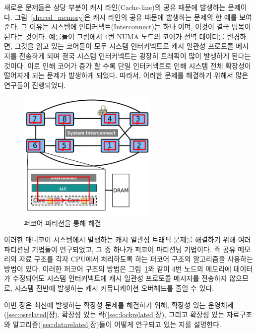 새로운 문제들은 상당 부분이 캐시 라인(Cache-line)의 공유 때문에 발생하는 문제이다.
그림~\ref{shared_memory}은 캐시 라인의 공유 때문에 발생하는 문제의 한 예를 보여준다. 
그 이유는 시스템에 인터커넥트(Interconnect)는 하나 이며, 이것이 결국 병목이 된다는 것이다. 
예를들어 그림에서 4번 NUMA 노드의 코어가 전역 데이터를 변경하면, 그것을 읽고 있는 코어들이 
모두 시스템 인터커넥트로 캐시 일관성 프로토콜 메시지를 전송하게 되며 결국 시스템 인터커넥트는 
굉장히 트래픽이 많이 발생하게 된다는 것이다.  
이로 인해 코어가 증가 할 수록 단일 인터커넥트로 인해 시스템 전체 
확장성이 떨어지게 되는 문제가 발생하게 되었다.
따라서, 이러한 문제를 해결하기 위해서 많은 연구들이 진행되었다. 

\begin{figure}[h!]
    \centering
    \includegraphics[width=0.6\textwidth]{fig/archcache_percore}
    \caption{퍼코어 파티션을 통해 해결}
  \label{shared_memory2}
\end{figure}

이러한 매니코어 시스템에서 발생하는 
캐시 일관성 트래픽 문제를 해결하기 위해 여러 파티션닝 기법들이 연구되었고, 
그 중 하나가 퍼코어 파티션닝 기법이다. 
즉 공유 메모리의 자료 구조를 각자 
CPU에서 처리하도록 하는 퍼코어 구조의 알고리즘을 사용하는 방법이 있다.
이러한 퍼코어 구조의 방법은 그림~\ref{shared_memory2}와 같이 4번 노드의 메모리에 데이터가 수정되어도 시스템 
인터커넥트에 캐시 일관성 프로토콜 메시지를 전송하지 않으므로, 
시스템 전반에 발생하는 캐시 커뮤니케이션 오버헤드를 줄일 수 있다. 

이번 장은 최신에 발생하는 확장성 문제를 해결하기 위해, 확장성 있는
운영체제(\ref{sec:osrelated}장), 확장성 있는 락(\ref{sec:lockrelated}장), 
그리고 확장성 있는 자료구조와 알고리즘(\ref{sec:datarelated}장)들이 어떻게 연구되고 
있는 지를 설명한다.




%



